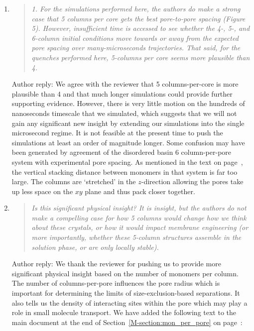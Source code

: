 \documentclass{article}
\begin{document}
\begin{enumerate}
    \item \begin{quote}
    \textit{1. For the simulations performed here, the authors do make a strong
	    case that 5 columns per core gets the best pore-to-pore spacing (Figure 5).
	    However, insufficient time is accessed to see whether the 4-, 5-, and 6-column
	    initial conditions move towards or away from the expected pore spacing over
	    many-microseconds trajectories. That said, for the quenches performed here,
	    5-columns per core seems more plausible than 4.}
    \end{quote}
	
    Author reply: We agree with the reviewer that 5 columns-per-core is more
    plausible than 4 and that much longer simulations could provide further
    supporting evidence. However, there is very little motion on the hundreds of
    nanoseconds timescale that we simulated, which suggests that we will not gain
    any significant new insight by extending our simulations into the single microsecond
    regime. 
    It is not feasible at the present time to push the simulations at least an order of magnitude longer.
    Some confusion may have been generated by agreement of the disordered basin
    6 column-per-pore system with experimental pore spacing. As mentioned in the
    text on page~\pageref{M-6colperpore}, the vertical stacking distance between 
    monomers in that system is far too large. The columns are `stretched' in the
    $z$-direction allowing the pores take up less space on the $xy$ plane and 
    thus pack closer together.  

    \item \begin{quote}    
    \textit{Is this significant physical insight? It is insight, but the
	    authors do not make a compelling case for how 5 columns would change how we
	    think about these crystals, or how it would impact membrane engineering (or
	    more importantly, whether these 5-column structures assemble in the solution
	    phase, or are only locally stable).}
    \end{quote}
    
    Author reply: We thank the reviewer for pushing us to provide more
    significant physical insight based on the number of monomers per column. The
    number of columns-per-pore influences the pore radius which is important for
    determining the limits of size-exclusion-based separations. It also tells us
    the density of interacting sites within the pore which may play a role in small
    molecule transport. We have added the following text to the main document at
    the end of Section~\ref{M-section:mon_per_pore} on page~\pageref{M-addition:pore_radius}:
    

\end{enumerate}
\end{document}
